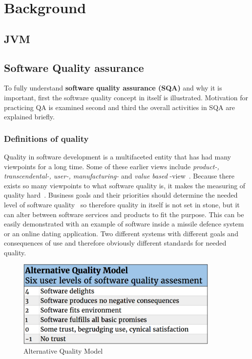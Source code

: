 \chapter{Background}
\label{chapter:background} 

\section{JVM} %
\section{Software Quality assurance} %
    To fully understand \textbf{software quality assurance (SQA)} and why it is important, first the software quality concept in itself is illustrated.
    Motivation for practicing QA is examined second and third the overall activities in SQA are explained briefly.
    \subsection{Definitions of quality}
    Quality in software development is a multifaceted entity that has had many viewpoints for a long time.
    Some of these earlier views include \textit{product-, transcendental-, user-, manufacturing-} and \textit{value based} -view~\cite{kitchenham1996elusive}.
    Because there exists so many viewpoints to what software quality is, it makes the measuring of quality hard~\cite{kitchenham1996elusive}.
    Business goals and their priorities should determine the needed level of software quality~\cite{kitchenham1996elusive} so therefore
    quality in itself is not set in stone, but it can alter between software services and products to fit the purpose.
    This can be easily demonstrated with an example of software inside a missile defence system or an online dating application.
    Two different systems with different goals and consequences of use and therefore obviously different standards for needed quality.

    \begin{figure}[ht]
      \begin{center}
        \includegraphics[width=10cm]{images/alternativeQM.png}
        \caption{Alternative Quality Model}
        \label{fig:AQM}
      \end{center}
    \end{figure}

